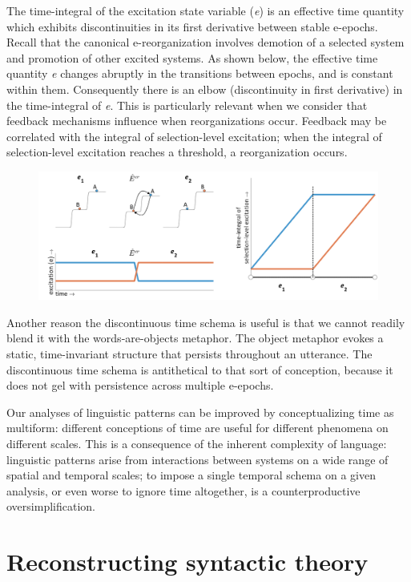   The time-integral of the excitation state variable (\textit{e}) is an effective time quantity which exhibits discontinuities in its first derivative between stable e-epochs. Recall that the canonical e-reorganization involves demotion of a selected system and promotion of other excited systems. As shown below, the effective time quantity \textit{e} changes abruptly in the transitions between epochs, and is constant within them. Consequently there is an elbow (discontinuity in first derivative) in the time-integral of \textit{e}. This is particularly relevant when we consider that feedback mechanisms influence when reorganizations occur. Feedback may be correlated with the integral of selection-level excitation; when the integral of selection-level excitation reaches a threshold, a reorganization occurs.

  
\begin{figure}
\includegraphics[width=\textwidth]{figures/Tilsen-img50.png}
\caption{\missingcaption}
\label{fig:}
\end{figure}
 

  Another reason the discontinuous time schema is useful is that we cannot readily blend it with the words-are-objects metaphor. The object metaphor evokes a static, time-invariant structure that persists throughout an utterance. The discontinuous time schema is antithetical to that sort of conception, because it does not gel with persistence across multiple e-epochs. 

  Our analyses of linguistic patterns can be improved by conceptualizing time as multiform: different conceptions of time are useful for different phenomena on different scales. This is a consequence of the inherent complexity of language: linguistic patterns arise from interactions between systems on a wide range of spatial and temporal scales; to impose a single temporal schema on a given analysis, or even worse to ignore time altogether, is a counterproductive oversimplification. 

\chapter{Reconstructing syntactic theory}

